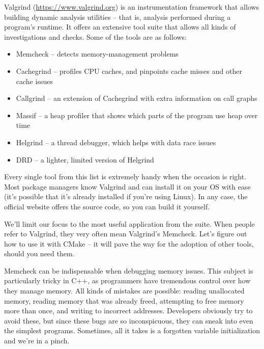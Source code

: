 
Valgrind (\url{https://www.valgrind.org}) is an instrumentation framework that allows building dynamic analysis utilities – that is, analysis performed during a program's runtime. It offers an extensive tool suite that allows all kinds of investigations and checks. Some of the tools are as follows:

\begin{itemize}
\item 
Memcheck – detects memory-management problems

\item 
Cachegrind – profiles CPU caches, and pinpoints cache misses and other cache issues

\item 
Callgrind – an extension of Cachegrind with extra information on call graphs

\item 
Massif – a heap profiler that shows which parts of the program use heap over time

\item 
Helgrind – a thread debugger, which helps with data race issues

\item 
DRD – a lighter, limited version of Helgrind
\end{itemize}

Every single tool from this list is extremely handy when the occasion is right. Most package managers know Valgrind and can install it on your OS with ease (it's possible that it's already installed if you're using Linux). In any case, the official website offers the source code, so you can build it yourself.

We'll limit our focus to the most useful application from the suite. When people refer to Valgrind, they very often mean Valgrind's Memcheck. Let's figure out how to use it with CMake – it will pave the way for the adoption of other tools, should you need them.


Memcheck can be indispensable when debugging memory issues. This subject is particularly tricky in C++, as programmers have tremendous control over how they manage memory. All kinds of mistakes are possible: reading unallocated memory, reading memory that was already freed, attempting to free memory more than once, and writing to incorrect addresses. Developers obviously try to avoid these, but since these bugs are so inconspicuous, they can sneak into even the simplest programs. Sometimes, all it takes is a forgotten variable initialization and we're in a pinch.

